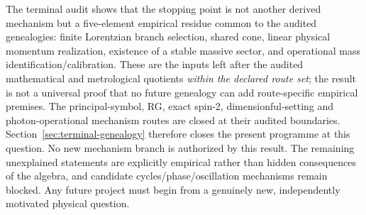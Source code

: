 \documentclass[11pt,a4paper]{article}
\begin{document}
The terminal audit shows that the stopping point is not another derived mechanism but a five-element empirical residue common to the audited genealogies: finite Lorentzian branch selection, shared cone, linear physical momentum realization, existence of a stable massive sector, and operational mass identification/calibration. These are the inputs left after the audited mathematical and metrological quotients \emph{within the declared route set}; the result is not a universal proof that no future genealogy can add route-specific empirical premises. The principal-symbol, RG, exact spin-2, dimensionful-setting and photon-operational mechanism routes are closed at their audited boundaries. Section~\ref{sec:terminal-genealogy} therefore closes the present programme at this question. No new mechanism branch is authorized by this result. The remaining unexplained statements are explicitly empirical rather than hidden consequences of the algebra, and candidate cycles/phase/oscillation mechanisms remain blocked. Any future project must begin from a genuinely new, independently motivated physical question.
\end{document}
